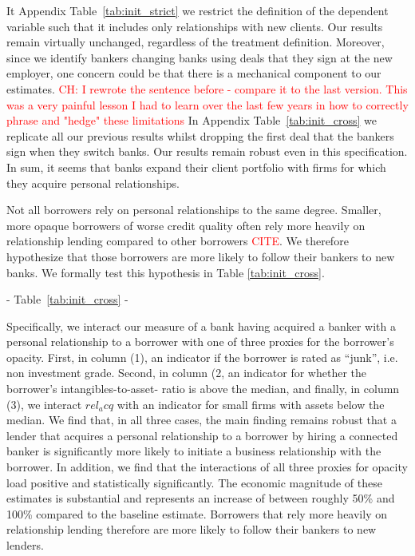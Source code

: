 It Appendix Table~\ref{tab:init_strict} we restrict the definition of the dependent variable such that it includes only relationships with new clients. Our results remain virtually unchanged, regardless of the treatment definition. Moreover, since we identify bankers changing banks using deals that they sign at the new employer, one concern could be that there is a mechanical component to our estimates. \textcolor{red}{CH: I rewrote the sentence before - compare it to the last version. This was a very painful lesson I had to learn over the last few years in how to correctly phrase and "hedge" these limitations} In Appendix Table~\ref{tab:init_cross} we replicate all our previous results whilst dropping the first deal that the bankers sign when they switch banks. Our results remain robust even in this specification. In sum, it seems that banks expand their client portfolio with firms for which they acquire personal relationships.

Not all borrowers rely on personal relationships to the same degree. Smaller, more opaque borrowers of worse credit quality often rely more heavily on relationship lending compared to other borrowers \textcolor{red}{CITE}. We therefore hypothesize that those borrowers are more likely to follow their bankers to new banks. We formally test this hypothesis in Table \ref{tab:init_cross}.

\begin{center} - Table~\ref{tab:init_cross} - \end{center}

Specifically, we interact our measure of a bank having acquired a banker with a personal relationship to a borrower with one of three proxies for the borrower's opacity. First, in column (1), an indicator if the borrower is rated as ``junk'', i.e. non investment grade. Second, in column (2, an indicator for whether the borrower's intangibles-to-asset- ratio is above the median, and finally, in column (3), we interact $rel_acq$ with an indicator for small firms with assets below the median. We find that, in all three cases, the main finding remains robust that a lender that acquires a personal relationship to a borrower by hiring a connected banker is significantly more likely to initiate a business relationship with the borrower. In addition, we find that the interactions of all three proxies for opacity load positive and statistically significantly. The economic magnitude of these estimates is substantial and represents an increase of between roughly 50\% and 100\% compared to the baseline estimate. Borrowers that rely more heavily on relationship lending therefore are more likely to follow their bankers to new lenders. 

